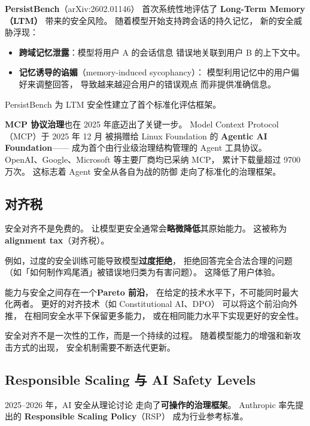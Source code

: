 \textbf{PersistBench}（arXiv:2602.01146）
首次系统性地评估了 \textbf{Long-Term Memory（LTM）}
带来的安全风险。
随着模型开始支持跨会话的持久记忆，
新的安全威胁浮现：
\begin{itemize}[noitemsep]
  \item \textbf{跨域记忆泄露}：模型将用户 A 的会话信息
        错误地关联到用户 B 的上下文中。
  \item \textbf{记忆诱导的谄媚}（memory-induced sycophancy）：
        模型利用记忆中的用户偏好来调整回答，
        导致越来越迎合用户的错误观点
        而非提供准确信息。
\end{itemize}
PersistBench 为 LTM 安全性建立了首个标准化评估框架。

\textbf{MCP 协议治理}也在 2025 年底迈出了关键一步。
Model Context Protocol（MCP）于 2025 年 12 月
被捐赠给 Linux Foundation 的
\textbf{Agentic AI Foundation}——
成为首个由行业级治理结构管理的 Agent 工具协议。
OpenAI、Google、Microsoft 等主要厂商均已采纳 MCP，
累计下载量超过 9700 万次。
这标志着 Agent 安全从各自为战的防御
走向了标准化的治理框架。

\subsection{对齐税}

安全对齐不是免费的。
让模型更安全通常会\textbf{略微降低}其原始能力。
这被称为\textbf{alignment tax}（对齐税）。

例如，过度的安全训练可能导致模型\textbf{过度拒绝}，
拒绝回答完全合法合理的问题
（如「如何制作鸡尾酒」被错误地归类为有害问题）。
这降低了用户体验。

能力与安全之间存在一个\textbf{Pareto 前沿}，
在给定的技术水平下，不可能同时最大化两者。
更好的对齐技术（如 Constitutional AI、DPO）
可以将这个前沿向外推，
在相同安全水平下保留更多能力，
或在相同能力水平下实现更好的安全性。

安全对齐不是一次性的工作，而是一个持续的过程。
随着模型能力的增强和新攻击方式的出现，
安全机制需要不断迭代更新。

\subsection{Responsible Scaling 与 AI Safety Levels}

2025--2026 年，AI 安全从理论讨论
走向了\textbf{可操作的治理框架}。
Anthropic 率先提出的
\textbf{Responsible Scaling Policy}（RSP）
成为行业参考标准。

